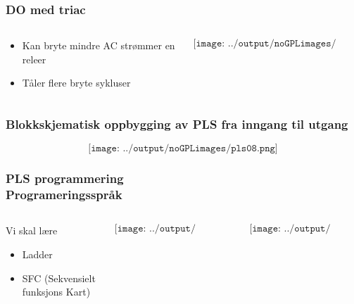 \documentclass[aspectratio=169,xcolor=dvipsnames]{beamer}
\begin{document}
\begin{frame}
	\frametitle{DO med triac}
	\begin{columns}
		\begin{column}{0.5\textwidth}
			\begin{itemize}
				\item Kan bryte mindre AC strømmer en releer
				\item Tåler flere bryte sykluser
			\end{itemize}

			
		\end{column}

		\begin{column}{0.5\textwidth}
	$$\texttt{[image: ../output/noGPLimages/pls05.png]}$$
		\end{column}
	\end{columns}
\end{frame}





\begin{frame}
	\frametitle{Blokkskjematisk oppbygging av PLS fra inngang til utgang}
	$$\texttt{[image: ../output/noGPLimages/pls08.png]}$$
\end{frame}

\begin{frame}
	\frametitle{PLS programmering \\ Programeringsspråk}
	\begin{columns}
		\begin{column}{0.3\textwidth}
			Vi skal lære
			\begin{itemize}
				\item Ladder 
				\item SFC (Sekvensielt funksjons Kart)
			\end{itemize}

			
		\end{column}

		\begin{column}{0.4\textwidth}
	$$\texttt{[image: ../output/noGPLimages/Ladder01.png]}$$
		\end{column}
		\begin{column}{0.3\textwidth}
	$$\texttt{[image: ../output/noGPLimages/SFC01.png]}$$
		\end{column}
	\end{columns}
\end{frame}
\end{document}

